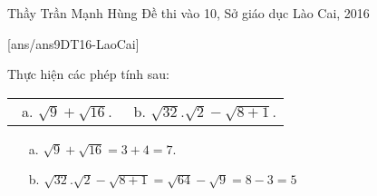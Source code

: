 \begin{name}
{Thầy  Trần Mạnh Hùng}
{Đề thi vào 10, Sở giáo dục Lào Cai, 2016}
\end{name}
\setcounter{ex}{0}
[ans/ans9DT16-LaoCai]
\begin{ex}
    \newline
    Thực hiện các phép tính sau:\\
        \begin{tabular}{m{} m{}}
         \ a. $\sqrt{9}+\sqrt{16}$.
        &
         \ b. $\sqrt{32}.\sqrt{2}-\sqrt{8+1}$.
		\end{tabular}
\loigiai
    {
    \begin{enumerate}
        \item[a.] $\sqrt{9}+\sqrt{16}=3+4=7$.
        \item[b.] $\sqrt{32}.\sqrt{2}-\sqrt{8+1}=\sqrt{64}-\sqrt{9}=8-3=5$
    \end{enumerate}
    }
\end{ex}
